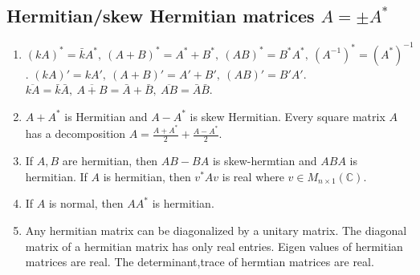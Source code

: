 \subsection{Hermitian/skew Hermitian matrices $A = \pm A^\ast$}
\begin{enumerate}
	\item $(kA)^\ast = \bar{k}A^\ast,\ (A+B)^\ast = A^\ast + B^\ast,\ (AB)^\ast = B^\ast A^\ast,\ (A^{-1})^\ast = (A^\ast)^{-1}$.
		\subitem $(kA)' = kA',\ (A+B)' = A'+B',\ (AB)' = B'A'$.
		\subitem $\overline{kA} = \bar{k} \bar{A},\ \overline{A+B} = \bar{A} + \bar{B},\ \overline{AB} = \bar{A}\bar{B}$.
	\item $A+A^\ast$ is Hermitian and $A-A^\ast$ is skew Hermitian.
		\subitem Every square matrix $A$ has a decomposition $A = \frac{A+A^\ast}{2} + \frac{A-A^\ast}{2}$.
	\item If $A,B$ are hermitian, then $AB-BA$ is skew-hermtian and $ABA$ is hermitian.
		\subitem If $A$ is hermitian, then $v^\ast A v$ is real where $v \in M_{n \times 1}(\mathbb{C})$.
	\item If $A$ is normal, then $AA^\ast$ is hermitian.
	\item Any hermitian matrix can be diagonalized by a unitary matrix.
		The diagonal matrix of a hermitian matrix has only real entries.
		Eigen values of hermitian matrices are real.
		\subitem The determinant,trace of hermtian matrices are real.
\end{enumerate}


